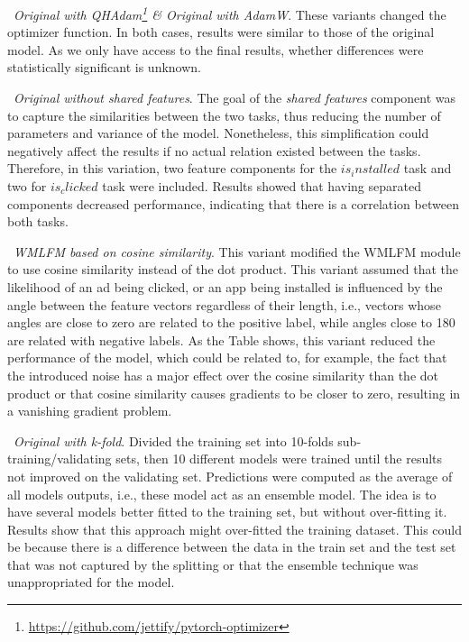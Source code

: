 \documentclass[manuscript,nonacm]{acmart}
\begin{document}
\noindent\textbullet~\textit{Original with QHAdam\footnote{\url{https://github.com/jettify/pytorch-optimizer}} \& Original with AdamW}. These variants changed the optimizer function. In both cases, results were similar to those of the original model. As we only have access to the final results, whether differences were statistically significant is unknown. 

\noindent\textbullet~\textit{Original without shared features}. The goal of the \textit{shared features} component was to capture the similarities between the two tasks, thus reducing the number of parameters and variance of the model. Nonetheless, this simplification could negatively affect the results if no actual relation existed between the tasks. Therefore, in this variation, two feature components for the $is_installed$ task and two for $is_clicked$ task were included. Results showed that having separated components decreased performance, indicating that there is a correlation between both tasks.

\noindent\textbullet~\textit{WMLFM based on cosine similarity}. This variant modified the WMLFM module to use cosine similarity instead of the dot product. This variant assumed that the likelihood of an ad being clicked, or an app being installed is influenced by the angle between the feature vectors regardless of their length, i.e., vectors whose angles are close to zero are related to the positive label, while angles close to 180 are related with negative labels. As the Table shows, this variant reduced the performance of the model, which could be related to, for example, the fact that the introduced noise has a major effect over the cosine similarity than the dot product or that cosine similarity causes gradients to be closer to zero, resulting in a vanishing gradient problem.

\noindent\textbullet~\textit{Original with k-fold}. Divided the training set into 10-folds sub-training/validating sets, then 10 different models were trained until the results not improved on the validating set. Predictions were computed as the average of all models outputs, i.e., these model act as an ensemble model. The idea is to have several models better fitted to the training set, but without over-fitting it. Results show that this approach might over-fitted the training dataset. This could be because there is a difference between the data in the train set and the test set that was not captured by the splitting or that the ensemble technique was unappropriated for the model.
\end{document}
